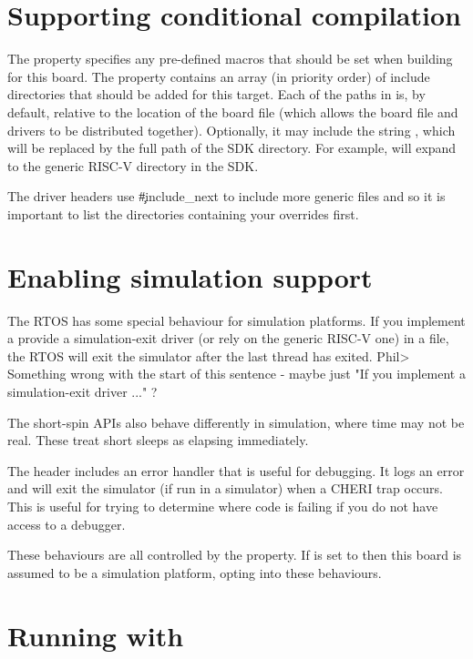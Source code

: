 \section{Supporting conditional compilation}

The  property specifies any pre-defined macros that should be set when building for this board.
The  property contains an array (in priority order) of include directories that should be added for this target.
Each of the paths in  is, by default, relative to the location of the board file (which allows the board file and drivers to be distributed together).
Optionally, it may include the string , which will be replaced by the full path of the SDK directory.
For example,  will expand to the generic RISC-V directory in the SDK.

The driver headers use \c{#include_next} to include more generic files and so it is important to list the directories containing your overrides first.

\section{Enabling simulation support}

The RTOS has some special behaviour for simulation platforms.
If you implement a provide a simulation-exit driver (or rely on the generic RISC-V one) in a  file, the RTOS will exit the simulator after the last thread has exited.
Phil> Something wrong with the start of this sentence - maybe just "If you implement a simulation-exit driver ..." ?

The short-spin APIs also behave differently in simulation, where time may not be real.
These treat short sleeps as elapsing immediately.

The  header includes an error handler that is useful for debugging.
It logs an error and will exit the simulator (if run in a simulator) when a CHERI trap occurs.
This is useful for trying to determine where code is failing if you do not have access to a debugger.

These behaviours are all controlled by the  property.
If  is set to  then this board is assumed to be a simulation platform, opting into these behaviours.

\section{Running with }

